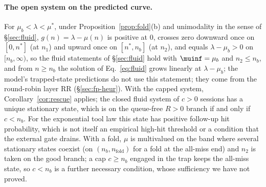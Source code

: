 \paragraph{The open system on the predicted curve.} For $\mu_b<\lambda<\mu^*$, under Proposition~\ref{prop:fold}(b) and unimodality in the sense of \S\ref{sec:fluid}, $g(n)=\lambda-\mu(n)$ is positive at 0, crosses zero downward once on $[0,n^*]$ (at $n_1$) and upward once on $[n^*,n_b]$ (at $n_2$), and equals $\lambda-\mu_b>0$ on $[n_b,\infty)$, so the fluid statements of \S\ref{sec:fluid} hold with $\muinf=\mu_b$ and $n_2\le n_b$, and from $n\ge n_b$ the solution of Eq.~\eqref{eq:fluid} grows linearly at $\lambda-\mu_b$; the model's trapped-state predictions do not use this statement; they come from the round-robin layer RR (\S\ref{sec:fp-heur}). With the capped system, Corollary~\ref{cor:rescue} applies; the closed fluid system of $c>0$ sessions has a unique stationary state, which is on the queue-free $R>0$ branch if and only if $c<n_b$. For the exponential tool law this state has positive follow-up hit probability, which is not itself an empirical high-hit threshold or a condition that the external gate drains. With a fold, $\mu$ is multivalued on the band where several stationary states coexist (on $(n_b,n_{\mathrm{fold}})$ for a fold at the all-miss end) and $n_2$ is taken on the good branch; a cap $c\ge n_b$ engaged in the trap keeps the all-miss state, so $c<n_b$ is a further necessary condition, whose sufficiency we have not proved.

